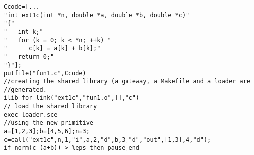 \begin{examples}
\begin{Verbatim}
Ccode=[...
"int ext1c(int *n, double *a, double *b, double *c)"
"{"
"   int k;"
"   for (k = 0; k < *n; ++k) "
"      c[k] = a[k] + b[k];"
"   return 0;"
"}"];
putfile("fun1.c",Ccode)
//creating the shared library (a gateway, a Makefile and a loader are
//generated. 
ilib_for_link("ext1c","fun1.o",[],"c") 
// load the shared library 
exec loader.sce 
//using the new primitive
a=[1,2,3];b=[4,5,6];n=3;
c=call("ext1c",n,1,"i",a,2,"d",b,3,"d","out",[1,3],4,"d");
if norm(c-(a+b)) > %eps then pause,end
\end{Verbatim}
\end{examples}
\begin{manseealso}
\end{manseealso}

